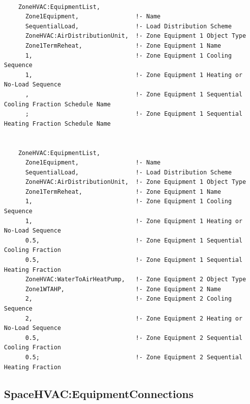 \begin{lstlisting}

    ZoneHVAC:EquipmentList,
      Zone1Equipment,                !- Name
      SequentialLoad,                !- Load Distribution Scheme
      ZoneHVAC:AirDistributionUnit,  !- Zone Equipment 1 Object Type
      Zone1TermReheat,               !- Zone Equipment 1 Name
      1,                             !- Zone Equipment 1 Cooling Sequence
      1,                             !- Zone Equipment 1 Heating or No-Load Sequence
      ,                              !- Zone Equipment 1 Sequential Cooling Fraction Schedule Name
      ;                              !- Zone Equipment 1 Sequential Heating Fraction Schedule Name


    ZoneHVAC:EquipmentList,
      Zone1Equipment,                !- Name
      SequentialLoad,                !- Load Distribution Scheme
      ZoneHVAC:AirDistributionUnit,  !- Zone Equipment 1 Object Type
      Zone1TermReheat,               !- Zone Equipment 1 Name
      1,                             !- Zone Equipment 1 Cooling Sequence
      1,                             !- Zone Equipment 1 Heating or No-Load Sequence
      0.5,                           !- Zone Equipment 1 Sequential Cooling Fraction
      0.5,                           !- Zone Equipment 1 Sequential Heating Fraction
      ZoneHVAC:WaterToAirHeatPump,   !- Zone Equipment 2 Object Type
      Zone1WTAHP,                    !- Zone Equipment 2 Name
      2,                             !- Zone Equipment 2 Cooling Sequence
      2,                             !- Zone Equipment 2 Heating or No-Load Sequence
      0.5,                           !- Zone Equipment 2 Sequential Cooling Fraction
      0.5;                           !- Zone Equipment 2 Sequential Heating Fraction
\end{lstlisting}

\subsection{SpaceHVAC:EquipmentConnections}\label{spacehvacequipmentconnections}

